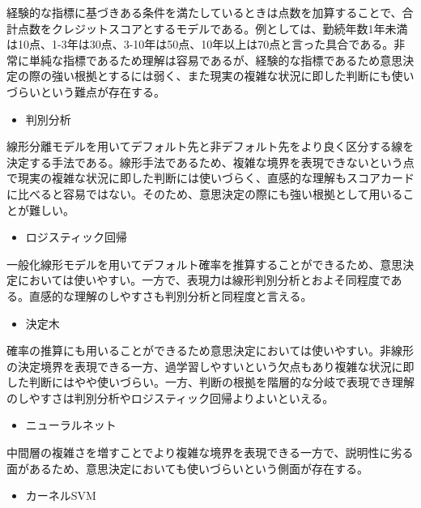 \documentclass[11pt]{jsarticle}
\providecommand{\tightlist}{%
      \setlength{\itemsep}{0pt}\setlength{\parskip}{0pt}}
\begin{document}
経験的な指標に基づきある条件を満たしているときは点数を加算することで、合計点数をクレジットスコアとするモデルである。例としては、勤続年数1年未満は10点、1-3年は30点、3-10年は50点、10年以上は70点と言った具合である\cite{scorecard}。非常に単純な指標であるため理解は容易であるが、経験的な指標であるため意思決定の際の強い根拠とするには弱く、また現実の複雑な状況に即した判断にも使いづらいという難点が存在する。

\begin{itemize}
\tightlist
\item
  判別分析
\end{itemize}

線形分離モデルを用いてデフォルト先と非デフォルト先をより良く区分する線を決定する手法である。線形手法であるため、複雑な境界を表現できないという点で現実の複雑な状況に即した判断には使いづらく、直感的な理解もスコアカードに比べると容易ではない。そのため、意思決定の際にも強い根拠として用いることが難しい。

\begin{itemize}
\tightlist
\item
  ロジスティック回帰
\end{itemize}

一般化線形モデルを用いてデフォルト確率を推算することができるため、意思決定においては使いやすい。一方で、表現力は線形判別分析とおよそ同程度である。直感的な理解のしやすさも判別分析と同程度と言える。

\begin{itemize}
\tightlist
\item
  決定木
\end{itemize}

確率の推算にも用いることができるため意思決定においては使いやすい。非線形の決定境界を表現できる一方、過学習しやすいという欠点もあり複雑な状況に即した判断にはやや使いづらい。一方、判断の根拠を階層的な分岐で表現でき理解のしやすさは判別分析やロジスティック回帰よりよいといえる。

\begin{itemize}
\tightlist
\item
  ニューラルネット
\end{itemize}

中間層の複雑さを増すことでより複雑な境界を表現できる一方で、説明性に劣る面があるため、意思決定においても使いづらいという側面が存在する。

\begin{itemize}
\tightlist
\item
  カーネルSVM
\end{itemize}
\end{document}
